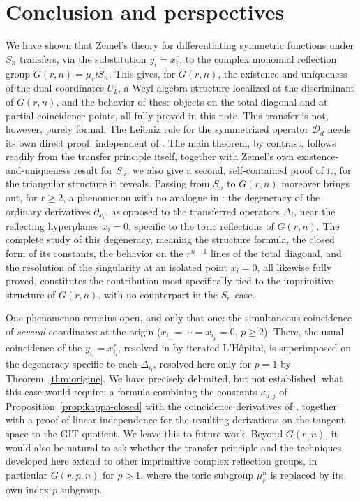 \documentclass[10pt,a4paper]{amsart}
\begin{document}
\section{Conclusion and perspectives}

We have shown that Zemel's theory \cite{Ze} for differentiating symmetric functions under $S_n$ transfers, via the substitution $y_i=x_i^r$, to the complex monomial reflection group $G(r,n)=\mu_r\wr S_n$. This gives, for $G(r,n)$, the existence and uniqueness of the dual coordinates $U_k$, a Weyl algebra structure localized at the discriminant of $G(r,n)$, and the behavior of these objects on the total diagonal and at partial coincidence points, all fully proved in this note. This transfer is not, however, purely formal. The Leibniz rule for the symmetrized operator $\mathcal D_d$ needs its own direct proof, independent of \cite{Ze}. The main theorem, by contrast, follows readily from the transfer principle itself, together with Zemel's own existence-and-uniqueness result for $S_n$; we also give a second, self-contained proof of it, for the triangular structure it reveals. Passing from $S_n$ to $G(r,n)$ moreover brings out, for $r\ge2$, a phenomenon with no analogue in \cite{Ze}: the degeneracy of the ordinary derivatives $\partial_{x_i}$, as opposed to the transferred operators $\Delta_i$, near the reflecting hyperplanes $x_i=0$, specific to the toric reflections of $G(r,n)$. The complete study of this degeneracy, meaning the structure formula, the closed form of its constants, the behavior on the $r^{n-1}$ lines of the total diagonal, and the resolution of the singularity at an isolated point $x_i=0$, all likewise fully proved, constitutes the contribution most specifically tied to the imprimitive structure of $G(r,n)$, with no counterpart in the $S_n$ case.

One phenomenon remains open, and only that one: the simultaneous coincidence of \emph{several} coordinates at the origin ($x_{i_1}=\cdots=x_{i_p}=0$, $p\ge2$). There, the usual coincidence of the $y_{i_l}=x_{i_l}^r$, resolved in \cite{Ze} by iterated L'Hôpital, is superimposed on the degeneracy specific to each $\Delta_{i_l}$, resolved here only for $p=1$ by Theorem~\ref{thm:origine}. We have precisely delimited, but not established, what this case would require: a formula combining the constants $\kappa_{d,j}$ of Proposition~\ref{prop:kappa-closed} with the coincidence derivatives of \cite{Ze}, together with a proof of linear independence for the resulting derivations on the tangent space to the GIT quotient. We leave this to future work. Beyond $G(r,n)$, it would also be natural to ask whether the transfer principle and the techniques developed here extend to other imprimitive complex reflection groups, in particular $G(r,p,n)$ for $p>1$, where the toric subgroup $\mu_r^n$ is replaced by its own index-$p$ subgroup.
\end{document}
